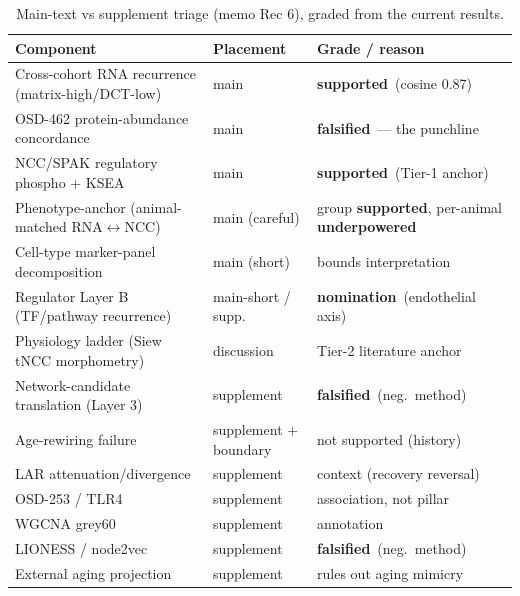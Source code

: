 \documentclass[10pt]{article}
\newcommand{\grsup}{\textcolor{good}{\textbf{supported}}}
\newcommand{\fals}{\textcolor{bad}{\textbf{falsified}}}
\newcommand{\under}{\textcolor{neut}{\textbf{underpowered}}}
\newcommand{\nom}{\textcolor{neut}{\textbf{nomination}}}
\begin{document}
\begin{table}[t]
\centering\small
\renewcommand{\arraystretch}{1.15}
\begin{tabular}{p{6.4cm} l p{4.6cm}}
\toprule
\textbf{Component} & \textbf{Placement} & \textbf{Grade / reason}\\
\midrule
Cross-cohort RNA recurrence (matrix-high/DCT-low) & main & \grsup\ (cosine 0.87)\\
OSD-462 protein-abundance concordance & main & \fals\ --- the punchline\\
NCC/SPAK regulatory phospho + KSEA & main & \grsup\ (Tier-1 anchor)\\
Phenotype-anchor (animal-matched RNA$\leftrightarrow$NCC) & main (careful) & group \grsup, per-animal \under\\
Cell-type marker-panel decomposition & main (short) & bounds interpretation\\
Regulator Layer B (TF/pathway recurrence) & main-short / supp.\ & \nom\ (endothelial axis)\\
Physiology ladder (Siew tNCC morphometry) & discussion & Tier-2 literature anchor\\
Network-candidate translation (Layer 3) & supplement & \fals\ (neg.\ method)\\
Age-rewiring failure & supplement + boundary & not supported (history)\\
LAR attenuation/divergence & supplement & context (recovery reversal)\\
OSD-253 / TLR4 & supplement & association, not pillar\\
WGCNA grey60 & supplement & annotation\\
LIONESS / node2vec & supplement & \fals\ (neg.\ method)\\
External aging projection & supplement & rules out aging mimicry\\
\bottomrule
\end{tabular}
\caption{Main-text vs supplement triage (memo Rec 6), graded from the current results.}
\label{tab:triage}
\end{table}
\end{document}
